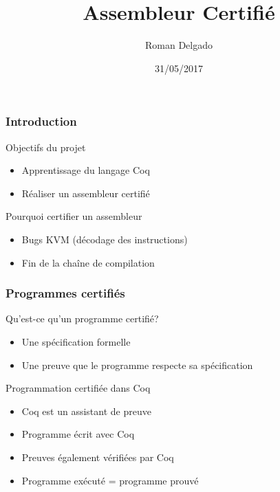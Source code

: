 \documentclass{beamer}
\title{Assembleur Certifié}
\author{Roman Delgado}
\institute[\textsc{Upmc}]{Université Pierre et Marie Curie}
\date{31/05/2017}
\begin{document}
\begin{frame}

\titlepage

\end{frame}


\begin{frame}
  \frametitle{Introduction}

  \begin{block}{Objectifs du projet}
    \begin{itemize}
    \item Apprentissage du langage Coq
    \item Réaliser un assembleur certifié
    \end{itemize}
  \end{block}

  \begin{block}{Pourquoi certifier un assembleur}
    \begin{itemize}
    \item Bugs KVM (décodage des instructions)
    \item Fin de la chaîne de compilation 
    \end{itemize}
  \end{block}   
\end{frame}
\begin{frame}[b,fragile]

\frametitle{Programmes certifiés}

\vfill

\begin{block}{Qu'est-ce qu'un programme certifié?}
  \begin{itemize}
  \item Une spécification formelle
  \item Une preuve que le programme respecte sa spécification
  \end{itemize}
\end{block}
\begin{block}{Programmation certifiée dans Coq}
  \begin{itemize}
  \item Coq est un assistant de preuve
  \item Programme écrit avec Coq 
  \item Preuves également vérifiées par Coq
  \item Programme exécuté = programme prouvé      
  \end{itemize}
\end{block}
\vfill


\end{frame}
\end{document}
